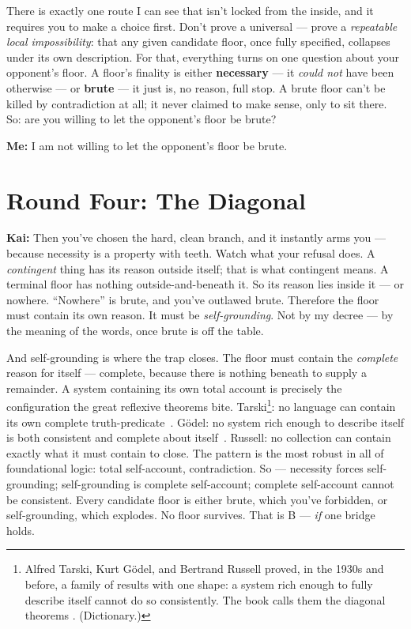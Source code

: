 \documentclass[fontsize=11pt,paper=a4,pagesize=auto,parskip=half-]{scrbook}
\makeatletter
\newcommand{\Ixtmp}{}
\DeclareRobustCommand{\Ix}[1]{%
  #1%
  \begingroup
    \lowercase{\gdef\Ixtmp{#1}}%
    \expandafter\index\expandafter{\Ixtmp}%
  \endgroup}
\newcommand{\Iy}[1]{#1\index{#1}}
\newcommand{\Iyk}[2]{#2\index{#1@#2}}
\newcommand{\speaker}[1]{\par\noindent\textbf{#1:}\hspace{0.6em}}
\makeatother
\begin{document}
There is exactly one route I can see that isn't locked from the inside, and it requires you to make a choice first. Don't prove a universal --- prove a \emph{repeatable local impossibility}: that any given candidate floor, once fully specified, collapses under its own description. For that, everything turns on one question about your opponent's floor. A floor's finality is either \textbf{necessary} --- it \emph{could not} have been otherwise --- or \textbf{brute} --- it just is, no reason, full stop. A brute floor can't be killed by contradiction at all; it never claimed to make sense, only to sit there. So: are you willing to let the opponent's floor be brute?

\speaker{Me} I am not willing to let the opponent's floor be brute.

\section{Round Four: The Diagonal}

\speaker{Kai} Then you've chosen the hard, clean branch, and it instantly arms you --- because necessity is a property with teeth. Watch what your refusal does. A \emph{contingent} thing has its reason outside itself; that is what contingent means. A terminal floor has nothing outside-and-beneath it. So its reason lies inside it --- or nowhere. ``Nowhere'' is brute, and you've outlawed brute. Therefore the floor must contain its own reason. It must be \emph{self-grounding}. Not by my decree --- by the meaning of the words, once brute is off the table.

And self-grounding is where the trap closes. The floor must contain the \emph{complete} reason for itself --- complete, because there is nothing beneath to supply a remainder. A system containing its own total account is precisely the configuration the great reflexive theorems bite. Tarski\footnote{Alfred \Iy{Tarski}, Kurt \Iyk{Godel}{G\"odel}, and Bertrand Russell proved, in the 1930s and before, a family of results with one shape: a system rich enough to fully describe itself cannot do so consistently. The book calls them the \Ix{diagonal theorems}. (Dictionary.)}: no language can contain its own complete truth-predicate~\cite{tarski1956}. Gödel: no system rich enough to describe itself is both consistent and complete about itself~\cite{goedel1931}. Russell: no collection can contain exactly what it must contain to close. The pattern is the most robust in all of foundational logic: total self-account, contradiction. So --- necessity forces self-grounding; self-grounding is complete self-account; complete self-account cannot be consistent. Every candidate floor is either brute, which you've forbidden, or self-grounding, which explodes. No floor survives. That is B --- \emph{if} one bridge holds.
\end{document}
